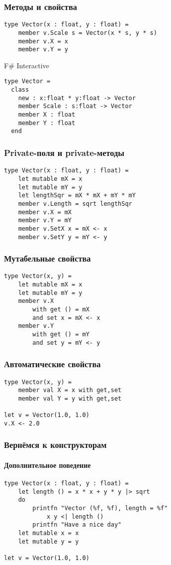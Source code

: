\documentclass[xetex,mathserif,serif]{beamer}
\begin{document}
	\begin{frame}[fragile]
		\frametitle{Методы и свойства}
		\begin{verbatim}
type Vector(x : float, y : float) = 
    member v.Scale s = Vector(x * s, y * s)
    member v.X = x
    member v.Y = y
		\end{verbatim}

		\begin{alertblock}{F\# Interactive}
			\begin{verbatim}
type Vector =
  class
    new : x:float * y:float -> Vector
    member Scale : s:float -> Vector
    member X : float
    member Y : float
  end
			\end{verbatim}
		\end{alertblock}
\end{frame}

	\begin{frame}[fragile]
		\frametitle{Private-поля и private-методы}
		\begin{verbatim}
type Vector(x : float, y : float) = 
    let mutable mX = x
    let mutable mY = y
    let lengthSqr = mX * mX + mY * mY
    member v.Length = sqrt lengthSqr
    member v.X = mX
    member v.Y = mY
    member v.SetX x = mX <- x
    member v.SetY y = mY <- y
		\end{verbatim}
\end{frame}

	\begin{frame}[fragile]
		\frametitle{Мутабельные свойства}
		\begin{verbatim}
type Vector(x, y) = 
    let mutable mX = x
    let mutable mY = y
    member v.X 
        with get () = mX
        and set x = mX <- x
    member v.Y
        with get () = mY
        and set y = mY <- y
		\end{verbatim}
\end{frame}

	\begin{frame}[fragile]
		\frametitle{Автоматические свойства}
		\begin{verbatim}
type Vector(x, y) = 
    member val X = x with get,set
    member val Y = y with get,set

let v = Vector(1.0, 1.0)
v.X <- 2.0
		\end{verbatim}
\end{frame}

	\begin{frame}[fragile]
		\frametitle{Вернёмся к конструкторам}
		\framesubtitle{Дополнительное поведение}
		\begin{verbatim}
type Vector(x : float, y : float) = 
    let length () = x * x + y * y |> sqrt
    do 
        printfn "Vector (%f, %f), length = %f" 
            x y <| length ()
        printfn "Have a nice day"
    let mutable x = x
    let mutable y = y

let v = Vector(1.0, 1.0)
		\end{verbatim}
\end{frame}
\end{document}
